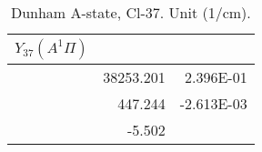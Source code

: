 \begin{table}[h]
\begin{tabular}{crr}
\toprule
$Y_{37} (A^1\Pi)$\\ \midrule 
& 38253.201 & 2.396E-01 \\
& 447.244 & -2.613E-03 \\
& -5.502 \\
\bottomrule
\end{tabular}\caption{Dunham A-state, Cl-37. Unit (1/cm).}\end{table}
